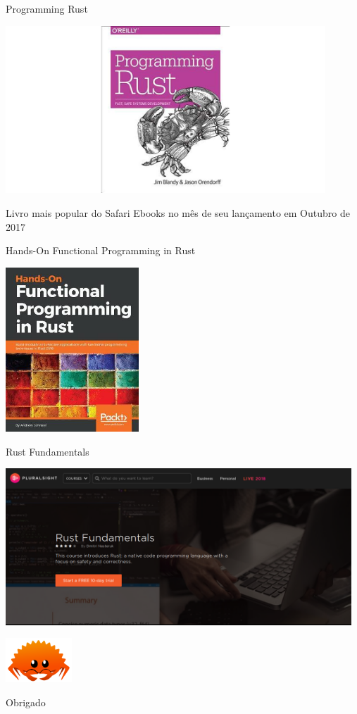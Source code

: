 \documentclass[aspectratio=169]{beamer}
\begin{document}
\begin{frame}{Programming Rust}
	\begin{center}
		\includegraphics[width=12.0cm]{imgs/programming-rust.jpg}	
	\end{center}
	Livro mais popular do Safari Ebooks no mês de seu lançamento em Outubro de 2017
\end{frame}

\begin{frame}{Hands-On Functional Programming in Rust}
	\begin{center}
		\includegraphics[width=5.0cm]{imgs/hands-on-functional-programming-in-rust.jpg}	
	\end{center}
\end{frame}

\begin{frame}{Rust Fundamentals}
	\begin{center}
		\includegraphics[width=13.0cm]{imgs/pluralsight.png}	
	\end{center}
\end{frame}

\begin{frame}[standout]
	\begin{center}
		\includegraphics[width=2.5cm]{imgs/rustacean.png}
	\end{center}
  	Obrigado
  		
\end{frame}
\end{document}
